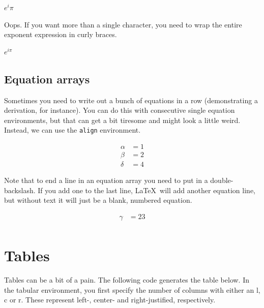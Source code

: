 \documentclass[12pt,a4paper]{article}
\begin{document}
  \begin{center}
    $e^i \pi$
  \end{center}

  Oops.  If you want more than a single character, you need to wrap the
  entire exponent expression in curly braces.

  \begin{center}
    $e^{i \pi}$
  \end{center}

  \subsection{Equation arrays}
  Sometimes you need to write out a bunch of equations in a row
  (demonstrating a derivation, for instance).  You can do this with
  consecutive single equation environments, but that can get a bit
  tiresome and might look a little weird.  Instead, we can use the
  \verb|align| environment.  

  \begin{align}
    \alpha &= 1 \\
    \beta &= 2 \\ 
    \delta &= 4 
  \end{align}

  Note that to end a line in an equation array you need to put in a
  double-backslash.  If you add one to the last line, \LaTeX\ will add
  another equation line, but without text it will just be a blank,
  numbered equation.  

  \begin{align}
    \gamma &= 23 \\
  \end{align}

  \section{Tables}
    Tables can be a bit of a pain. The following code generates the
    table below.  In the tabular environment, you first specify the
    number of columns with either an l, c or r.  These represent left-,
    center- and right-justified, respectively.  
\end{document}
